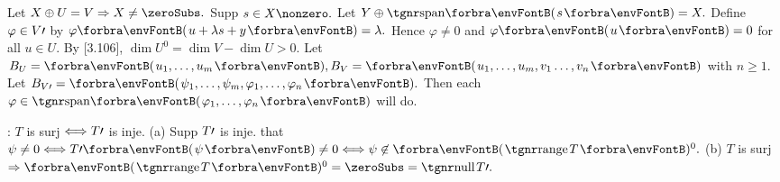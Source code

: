 
\ChEnd

\vfill{}

\vspace{4pt}

Let $X\oplus U=V\Rightarrow X\neq\zeroSubs.$ Supp $s\in X\nonzero.$ Let $Y\oplus\Span{s}=X.$\parSol{}
Define $\varphi\in V\prime$ by $\varphi\Par{u+\lambda s+y}=\lambda.$ Hence $\varphi\neq 0$ and $\varphi\Par{u}=0$ for all $u\in U.$\PfEnd\parSol{\vspace{4pt}}
\Or {} \;By [3.106], $\dim U^0=\dim V-\dim U>0.$\parSol{}
\Blind{\Or }\Or Let $B_U=\Par{u_1,\dots,u_m},B_V=\Par{u_1,\dots,u_m,v_1\dots,v_n}$ with $n\geqslant 1.$\parSol{}
\Blind{\Or}Let $B_{V\apostrophe}=\Par{\psi_1,\dots,\psi_m,\varphi_1,\dots,\varphi_n}.$ Then each $\varphi\in\Span{\varphi_1,\dots,\varphi_n}$ will do.\PfEnd\vspace{4pt}
\ACoro {}\par
{}: $T$ is surj $\Longleftrightarrow T\prime$ is inje.\parCom
(a) Supp $T\prime$ is inje. \NOTICE that $\psi\neq 0\Longleftrightarrow T\apostrophe\Par{\psi}\neq 0\Longleftrightarrow\psi\not\in\Par{\range T}{^0}.$\parCom
(b) $T$ is surj $\Rightarrow\Par{\range T}{^0}=\zeroSubs=\null T\apostrophe.$\PfEnd
\SepLine

